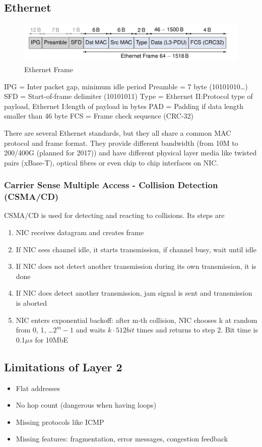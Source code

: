 \subsection{Ethernet}
\begin{figure}[H]
  \centering
  \includegraphics[width=.8\textwidth]{figures/ethernet_frame.png}
  \caption{Ethernet Frame}\label{fig:ethernet_frame}
\end{figure}
IPG = Inter packet gap, minimum idle period
Preamble = 7 byte (10101010\dots)
SFD = Start-of-frame delimiter (10101011)
Type = Ethernet II:\@ Protocol type of payload, Ethernet I:\@ length of payload in bytes
PAD = Padding if data length smaller than 46 byte
FCS = Frame check sequence (CRC-32)

There are several Ethernet standards, but they all share a common MAC protocol and frame format.
They provide different bandwidth (from 10M to 200/400G (planned for 2017)) and have different physical layer media like twisted pairs (xBase-T), optical fibres or even chip to chip interfaces on NIC.

\subsubsection{Carrier Sense Multiple Access - Collision Detection (CSMA/CD)}
CSMA/CD is used for detecting and reacting to collisions.
Its steps are
\begin{enumerate}
  \item NIC receives datagram and creates frame
  \item If NIC sees channel idle, it starts transmission, if channel busy, wait until idle
  \item If NIC does not detect another transmission during its own transmission, it is done
  \item If NIC does detect another transmission, jam signal is sent and transmission is aborted
  \item NIC enters exponential backoff: after m-th collision, NIC chooses k at random from 0, 1, \dots $2^m - 1$ and waits $k \cdot 512bit$ times and returns to step 2.
    Bit time is 0.1$\mu s$ for 10MbE
\end{enumerate}

\subsection{Limitations of Layer 2}
\begin{itemize}
  \item Flat addresses
  \item No hop count (dangerous when having loops)
  \item Missing protocols like ICMP
  \item Missing features: fragmentation, error messages, congestion feedback
\end{itemize}

